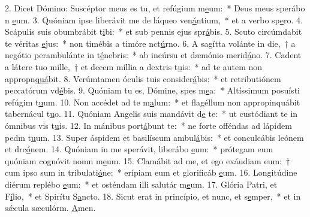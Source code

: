 2. Dicet Dómino: Suscéptor meus es tu, et refúgium m\uline{e}um:~* Deus meus sperábo n \uline{e}um.
3. Quóniam ipse liberávit me de láqueo ven\uline{á}ntium,~* et a verbo sp\uline{e}ro.
4. Scápulis suis obumbrábit t\uline{i}bi:~* et sub pennis ejus spr\uline{á}bis.
5. Scuto circúmdabit te véritas \uline{e}jus:~* non timébis a timóre nct\uline{ú}rno.
6. A sagítta volánte in die,~† a negótio perambulánte in t\uline{é}nebris:~* ab incúrsu et dæmónio merid\uline{á}no.
7. Cadent a látere tuo mille,~† et decem míllia a dextris t\uline{u}is:~* ad te autem non appropn\uline{quá}bit.
8. Verúmtamen óculis tuis consider\uline{á}bis:~* et retributiónem peccatórum vd\uline{é}bis.
9. Quóniam tu es, Dómine, spes m\uline{e}a:~* Altíssimum posuísti refúgim t\uline{u}um.
10. Non accédet ad te m\uline{a}lum:~* et flagéllum non appropinquábit tabernácul t\uline{u}o.
11. Quóniam Angelis suis mandávit d\uline{e} te:~* ut custódiant te in ómnibus vis t\uline{u}is.
12. In mánibus port\uline{á}bunt te:~* ne forte offéndas ad lápidem pedm t\uline{u}um.
13. Super áspidem et basilíscum ambul\uline{á}bis:~* et conculcábis leónem et drc\uline{ó}nem.
14. Quóniam in me sperávit, liberábo \uline{e}um:~* prótegam eum quóniam cognóvit nomn m\uline{e}um.
15. Clamábit ad me, et ego exáudiam eum:~† cum ipso sum in tribulati\uline{ó}ne:~* erípiam eum et glorificáb \uline{e}um.
16. Longitúdine diérum replébo \uline{e}um:~* et osténdam illi salutár m\uline{e}um.
17. Glória Patri, et F\uline{í}lio,~* et Spirítu S\uline{a}ncto.
18. Sicut erat in princípio, et nunc, et s\uline{e}mper,~* et in sǽcula sæculórm. \uline{A}men.
